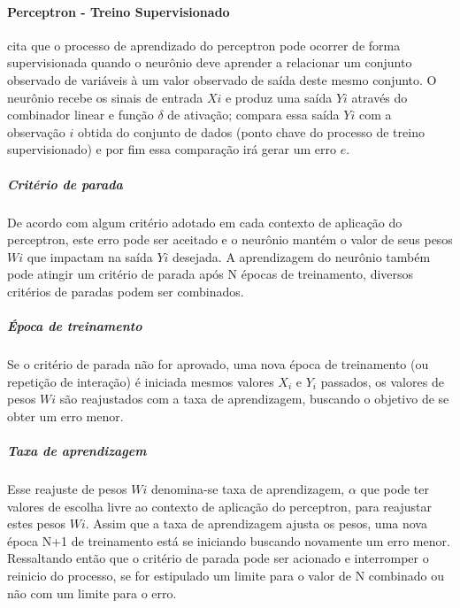 \documentclass[	12pt, Times, openright, twoside, a4paper, english, brazil]{abntex2}
\begin{document}
		      \paragraph*{Perceptron - Treino Supervisionado}
            \cite{Almeida2013} cita que o processo de aprendizado do perceptron pode ocorrer de forma supervisionada quando o neurônio deve aprender a relacionar um conjunto observado de variáveis à um valor observado de saída deste mesmo conjunto. O neurônio recebe os sinais de entrada $Xi$ e produz uma saída $Yi$ através do combinador linear e função $\delta$ de ativação; compara essa saída $Yi$ com a observação $i$ obtida do conjunto de dados (ponto chave do processo de treino supervisionado) e por fim essa comparação irá gerar um erro $e$.
            
            \subparagraph* {Critério de parada}
            	De acordo com algum critério adotado em cada contexto de aplicação do perceptron, este erro pode ser aceitado e o neurônio mantém o valor de seus pesos $Wi$ que impactam na saída $Yi$ desejada. A aprendizagem do neurônio também pode atingir um critério de parada após N épocas de treinamento, diversos critérios de paradas  podem ser combinados.  
            	
            \subparagraph* {Época de treinamento}
            	Se o critério de parada não for aprovado, uma nova época de treinamento (ou repetição de interação) é iniciada mesmos valores $X_i$ e $Y_i$ passados, os valores de pesos $Wi$ são reajustados com a taxa de aprendizagem, buscando o objetivo de se obter um erro menor.
            	
            \subparagraph* {Taxa de aprendizagem}
            	Esse reajuste de pesos $Wi$ denomina-se taxa de aprendizagem, $\alpha$ que pode ter valores de escolha livre ao contexto de aplicação do perceptron, para reajustar estes pesos $Wi$. Assim que a taxa de aprendizagem ajusta os pesos, uma nova época N+1 de treinamento está se iniciando buscando novamente um erro menor. Ressaltando então que o critério de parada pode ser acionado e interromper o reinicio do processo, se for estipulado um limite para o valor de N combinado ou não com um limite para o erro. 
            	
\end{document}
